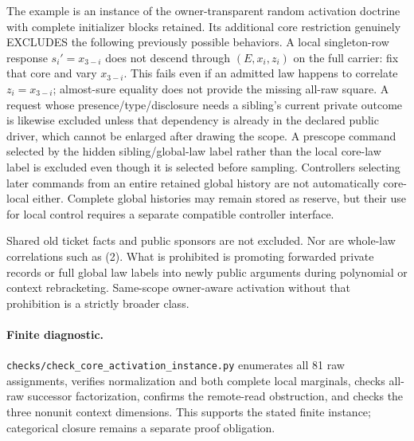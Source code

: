 \documentclass[11pt]{article}
\begin{document}
The example is an instance of the owner-transparent random activation doctrine with complete initializer blocks retained. Its additional core restriction genuinely EXCLUDES the following previously possible behaviors. A local singleton-row response $s_i'=x_{3-i}$ does not descend through $(E,x_i,z_i)$ on the full carrier: fix that core and vary $x_{3-i}$. This fails even if an admitted law happens to correlate $z_i=x_{3-i}$; almost-sure equality does not provide the missing all-raw square. A request whose presence/type/disclosure needs a sibling's current private outcome is likewise excluded unless that dependency is already in the declared public driver, which cannot be enlarged after drawing the scope. A prescope command selected by the hidden sibling/global-law label rather than the local core-law label is excluded even though it is selected before sampling. Controllers selecting later commands from an entire retained global history are not automatically core-local either. Complete global histories may remain stored as reserve, but their use for local control requires a separate compatible controller interface.

Shared old ticket facts and public sponsors are not excluded. Nor are whole-law correlations such as (2). What is prohibited is promoting forwarded private records or full global law labels into newly public arguments during polynomial or context rebracketing. Same-scope owner-aware activation without that prohibition is a strictly broader class.

\paragraph{Finite diagnostic.}
\texttt{checks/check\_core\_activation\_instance.py} enumerates all 81 raw assignments, verifies normalization and both complete local marginals, checks all-raw successor factorization, confirms the remote-read obstruction, and checks the three nonunit context dimensions. This supports the stated finite instance; categorical closure remains a separate proof obligation.
\end{document}

